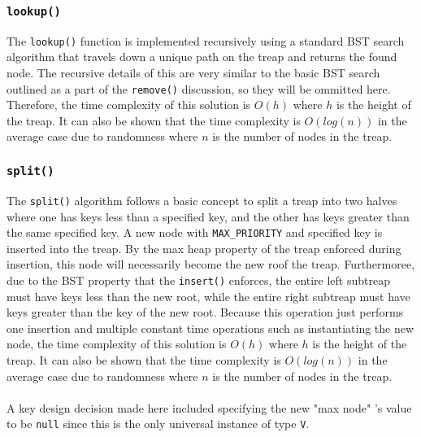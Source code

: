 \documentclass[11pt]{article}
\def\tt{\texttt}
\def\lu{\tt{lookup()}}
\def\ins{\tt{insert()}}
\def\rem{\tt{remove()}}
\def\split{\tt{split()}}
\begin{document}
\subsubsection{\lu}
The \lu{} function is implemented recursively using a standard BST search algorithm that travels down a unique path on the treap and returns the found node. The recursive details of this are very similar to the basic BST search outlined as a part of the \rem{} discussion, so they will be ommitted here. Therefore, the time complexity of this solution is $O(h)$ where $h$ is the height of the treap. It can also be shown that the time complexity is $O(log(n))$ in the average case due to randomness where $n$ is the number of nodes in the treap.
\subsubsection{\split{}}
The \split{} algorithm follows a basic concept to split a treap into two halves where one has keys less than a specified key, and the other has keys greater than the same specified key. A new node with \tt{MAX\_PRIORITY} and specified key is inserted into the treap. By the max heap property of the treap enforced during insertion, this node will necessarily become the new roof the treap. Furthermoree, due to the BST property that the \ins{} enforces, the entire left subtreap must have keys less than the new root, while the entire right subtreap must have keys greater than the key of the new root. Because this operation just performs one insertion and multiple constant time operations such as instantiating the new node, the time complexity of this solution is $O(h)$ where $h$ is the height of the treap. It can also be shown that the time complexity is $O(log(n))$ in the average case due to randomness where $n$ is the number of nodes in the treap. \\ \\
A key design decision made here included specifying the new "max node" 's value to be \tt{null} since this is the only universal instance of type \tt{V}. 	
\end{document}
